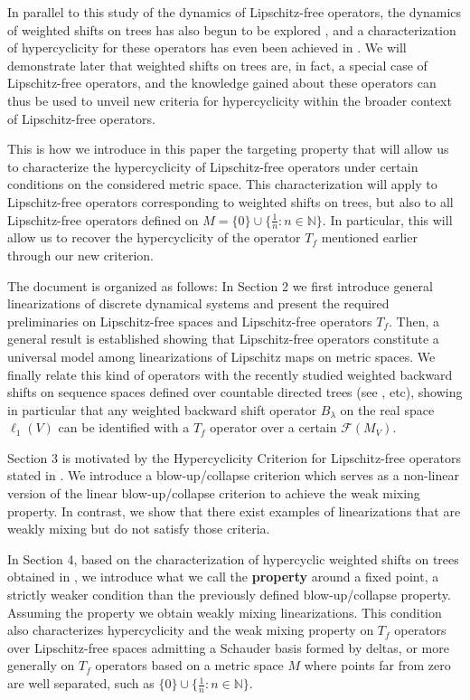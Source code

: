 \documentclass[12pt,english]{amsart}
\numberwithin{equation}{section}
\theoremstyle{plain}
\theoremstyle{definition}
\def\aim{\text{targeting}{}}
\newcommand{\free}[1]{\mathcal{F}(#1)}
\begin{document}
In parallel to this study of the dynamics of Lipschitz-free operators, the dynamics of weighted shifts on trees has also begun to be explored \cite{Ma17,AA25, LP25, GePapreprint, AC26}, and a characterization of hypercyclicity for these operators has even been achieved in \cite{GEPa23}. We will demonstrate later that weighted shifts on trees are, in fact, a special case of Lipschitz-free operators, and the knowledge gained about these operators can thus be used to unveil new criteria for hypercyclicity within the broader context of Lipschitz-free operators.

This is how we introduce in this paper the targeting property that will allow us to characterize the hypercyclicity of Lipschitz-free operators under certain conditions on the considered metric space. This characterization will apply to Lipschitz-free operators corresponding to weighted shifts on trees, but also to all Lipschitz-free operators defined on $M=\{0\}\cup\{\frac{1}{n}:n\in \mathbb{N}\}$. In particular, this will allow us to recover the hypercyclicity of the operator $T_f$ mentioned earlier through our new criterion.

The document is organized as follows: In Section 2 we first introduce general linearizations of discrete dynamical systems and present the required preliminaries on Lipschitz-free spaces and Lipschitz-free operators $T_f$. Then, a general result is established showing that Lipschitz-free operators constitute a universal model among linearizations of Lipschitz maps on metric spaces. We finally relate this kind of operators with the recently studied weighted backward shifts on sequence spaces defined over countable directed trees (see \cite{GEPa23}, etc), showing in particular that any weighted backward shift operator $B_\lambda$ on the real space $\ell_1(V)$ can be identified with a $T_f$ operator over a certain $\free{M_V}$.

Section 3 is motivated by the Hypercyclicity Criterion for Lipschitz-free operators stated in \cite{ACP21}. We introduce a blow-up/collapse criterion which serves as a non-linear version of the linear blow-up/collapse criterion to achieve the weak mixing property. In contrast, we show that there exist examples of linearizations that are weakly mixing but do not satisfy those criteria.

In Section 4, based on the characterization of hypercyclic weighted shifts on trees obtained in  \cite{GEPa23}, we introduce what we call the \textbf{\aim{} property} around a fixed point, a strictly weaker condition than the previously defined blow-up/collapse property.  Assuming the {\aim{} property} we obtain weakly mixing linearizations. This condition also characterizes hypercyclicity and the weak  mixing property on $T_f$ operators over Lipschitz-free spaces admitting a Schauder basis formed by deltas, or more generally on $T_f$ operators based on a metric space $M$ where points far from zero are well separated, such as $\{0\}\cup\{\frac{1}{n}:n\in \mathbb{N}\}$. 
\end{document}
